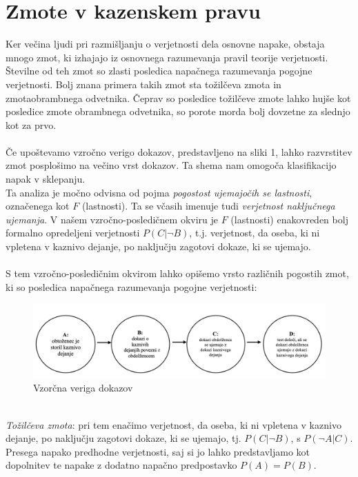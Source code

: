 \documentclass[fin1, tisk]{fmfdelo}
\theoremstyle{definition}
\theoremstyle{trditev}
\theoremstyle{izrek}
\begin{document}
\section{Zmote v kazenskem pravu}
Ker večina ljudi pri razmišljanju o verjetnosti dela osnovne napake, obstaja mnogo zmot, ki izhajajo iz osnovnega razumevanja pravil
teorije verjetnosti. Številne od teh zmot so zlasti posledica napačnega razumevanja pogojne verjetnosti. Bolj znana primera takih zmot sta
tožilčeva zmota in zmotaobrambnega odvetnika. Čeprav so posledice tožilčeve zmote
lahko hujše kot posledice zmote obrambnega odvetnika, so porote morda bolj dovzetne za slednjo kot za prvo. \\\\
Če upoštevamo vzročno verigo dokazov, predstavljeno na sliki 1, lahko razvrstitev zmot posplošimo na večino vrst dokazov. Ta shema
nam omogoča klasifikacijo napak v sklepanju.\\
Ta analiza je močno odvisna od pojma \textit{pogostost ujemajočih se lastnosti}, označenega kot $F$ (lastnosti). Ta se včasih imenuje
tudi \textit{verjetnost naključnega ujemanja}. V našem vzročno-posledičnem okviru je $F$ (lastnosti) enakovreden bolj formalno opredeljeni verjetnosti
$P(C \lvert \neg B)$, t.j. verjetnost, da oseba, ki ni vpletena v kaznivo dejanje, po naključju zagotovi dokaze, ki se ujemajo.\\\\
S tem vzročno-posledičnim okvirom lahko opišemo vrsto različnih pogostih zmot, ki so posledica napačnega razumevanja pogojne verjetnosti:\\
\begin{figure}[h]\label{fig:slika_3}
    \centering
    \includegraphics[scale=0.60]{slika_3.png}
    \caption{Vzorčna veriga dokazov}
 \end{figure}
 \\
\textit{Tožilčeva zmota}: pri tem enačimo  verjetnost, da oseba, ki ni vpletena v kaznivo dejanje, po naključju zagotovi dokaze, ki se ujemajo, 
tj. $P(C \lvert \neg B)$, s $P(\neg A \lvert C)$. Presega napako predhodne verjetnosti, saj si jo lahko 
predstavljamo kot dopolnitev te napake z dodatno napačno predpostavko $P(A) = P(B)$.\\\\
\end{document}
